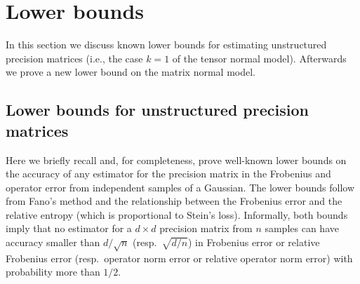 \documentclass[aos]{imsart}
\theoremstyle{definition}
\numberwithin{equation}{section}
\newcommand{\CF}[1]{{\color{purple}[CF: #1]}}
\newcommand{\CF}[1]{{}}
\begin{document}
\section{Lower bounds}\label{sec:lower}
In this section we discuss known lower bounds for estimating unstructured precision matrices (i.e., the case $k= 1$ of the tensor normal model). Afterwards we prove a new lower bound on the matrix normal model.

\subsection{Lower bounds for unstructured precision matrices}
Here we briefly recall and, for completeness, prove well-known lower bounds on the accuracy of any estimator for the precision matrix in the Frobenius and operator error from independent samples of a Gaussian. The lower bounds follow from Fano's method and the relationship between the Frobenius error and the relative entropy (which is proportional to Stein's loss).
Informally, both bounds imply that no estimator for a $d\times d$ precision matrix from $n$ samples can have accuracy smaller than $d/\sqrt{n}$ (resp.\ $\sqrt{d/n}$) in Frobenius error or relative Frobenius error (resp.\ operator norm error or relative operator norm error) with probability more than $1/2$.
\end{document}
